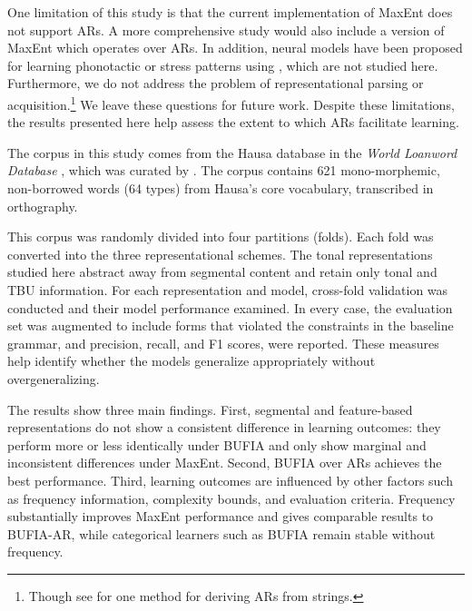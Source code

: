 \documentclass[11pt]{article}
\begin{document}
One limitation of this study is that the current implementation of
MaxEnt does not support ARs.  A more comprehensive study would also
include a version of MaxEnt which operates over ARs.  In addition,
neural models have been proposed for learning phonotactic or stress
patterns using
\citep{goldsmith94,mayer2020phonotactic,prickett2025learning}, which
are not studied here. Furthermore, we do not address the problem of
representational parsing or acquisition.\footnote{Though see
\citet{jardine2015concatenation} for one method for deriving ARs from
strings.} We leave these questions for future work.  Despite these
limitations, the results presented here help assess the extent to
which ARs facilitate learning.

The corpus in this study comes from the Hausa database in the
\textit{World Loanword Database} \citep{wold-4}, which was curated by
\citet{li2025learning}. The corpus contains 621 mono-morphemic,
non-borrowed words (64 types) from Hausa's core vocabulary,
transcribed in orthography.

This corpus was randomly divided into four partitions (folds).
Each fold was converted into the three representational schemes.
The tonal representations studied here abstract away from segmental content and
retain only tonal and TBU information.
For each representation and model, cross-fold validation was conducted and
their model performance examined.
In every case, the evaluation set was augmented to include forms
that violated the constraints in the baseline grammar,
and precision, recall, and F1 scores, were reported.
These measures help identify whether the models generalize appropriately without overgeneralizing.

The results show three main findings. First, segmental and
feature-based representations do not show a consistent
difference in learning outcomes: they perform more or less identically
under BUFIA and only show marginal and inconsistent differences
under MaxEnt. Second, BUFIA over ARs achieves the best performance.
Third, learning
outcomes are influenced by other factors such as frequency
information, complexity bounds, and evaluation criteria.
Frequency substantially improves MaxEnt performance and gives
comparable results to BUFIA-AR, while categorical learners such
as BUFIA remain stable without frequency.
\end{document}
